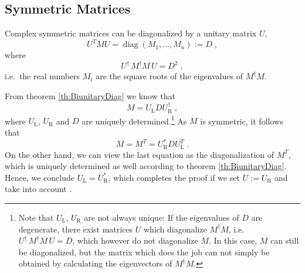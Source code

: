 \documentclass[12pt,a4paper,twoside]{scrartcl}
\DeclareMathOperator{\diag}{diag}
\numberwithin{equation}{section}
\numberwithin{table}{section}
\begin{document}
\subsection*{Symmetric Matrices}
\begin{Theorem} \label{th:SymmetricMatrixDiag}
 Complex symmetric matrices can be diagonalized by a unitary matrix $U$,
 \begin{equation}
        U^T M U = \diag(M_1,\dots,M_n) := D \;,
 \end{equation}
 where
 \begin{equation}
        U^\dagger \, M^\dagger M \, U = D^2 \;,
 \end{equation}
 i.e.\ the real numbers $M_i$ are the square roots of the eigenvalues of
 $M^\dagger M$.
\end{Theorem}
\begin{Proof}
 From theorem \ref{th:BiunitaryDiag} we know that 
 \begin{equation}
        M = U_\mathrm{L} D U_\mathrm{R}^\dagger \;,
 \end{equation}
 where $U_\mathrm{L}$, $U_\mathrm{R}$ and $D$ are uniquely 
 determined.\footnote{Note that $U_\mathrm{L}$, $U_\mathrm{R}$ are
 not always unique: If the eigenvalues
 of $D$ are degenerate, there exist matrices $U$ which diagonalize
 $M^\dagger M$, i.e. $U^\dagger\,M^\dagger M\, U=D$, which however
 do not diagonalize $M$. In this case, $M$ can still be diagonalized,
 but the matrix which does the job can not simply be obtained by calculating
 the eigenvectors of $M^\dagger M$.}
 As $M$ is symmetric, it follows that
 \begin{equation}
        M = M^T = U_\mathrm{R}^* D U_\mathrm{L}^T \;.
 \end{equation}
 On the other hand, we can view the last equation as the diagonalization
 of $M^T$, which is uniquely determined as well according to theorem
 \ref{th:BiunitaryDiag}.  Hence, we conclude 
 $U_\mathrm{L}=U_\mathrm{R}^*$, which completes the proof if we set
 $U:=U_\mathrm{R}$ and take into account .
\end{Proof}
\end{document}

